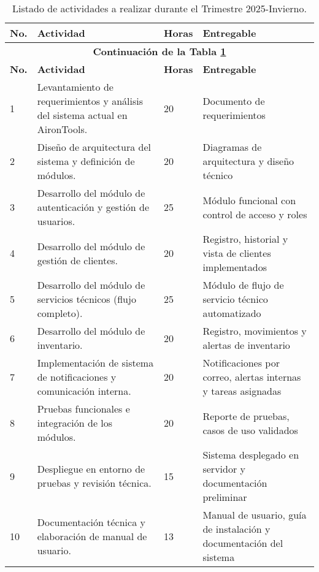 \begin{longtable}{p{} p{} p{} p{}}
	\caption{Listado de actividades a realizar durante el Trimestre 2025-Invierno.}
  	\label{table:calendarioActividades}\\
	\toprule
	\textbf{No.} & \textbf{Actividad} & \textbf{Horas} & \textbf{Entregable} \\
	\hline
	\endfirsthead

	\multicolumn{4}{c}{\textbf{Continuación de la Tabla \ref{table:calendarioActividades}}}\\
	\hline
	\textbf{No.} & \textbf{Actividad} & \textbf{Horas} & \textbf{Entregable} \\
	\hline
	\endhead

	\hline
	\endlastfoot

	1 & Levantamiento de requerimientos y análisis del sistema actual en AironTools. & 20 & Documento de requerimientos \\
	\midrule

	2 & Diseño de arquitectura del sistema y definición de módulos. & 20 & Diagramas de arquitectura y diseño técnico \\
	\midrule

	3 & Desarrollo del módulo de autenticación y gestión de usuarios. & 25 & Módulo funcional con control de acceso y roles \\
	\midrule

	4 & Desarrollo del módulo de gestión de clientes. & 20 & Registro, historial y vista de clientes implementados \\
	\midrule

	5 & Desarrollo del módulo de servicios técnicos (flujo completo). & 25 & Módulo de flujo de servicio técnico automatizado \\
	\midrule

	6 & Desarrollo del módulo de inventario. & 20 & Registro, movimientos y alertas de inventario \\
	\midrule

	7 & Implementación de sistema de notificaciones y comunicación interna. & 20 & Notificaciones por correo, alertas internas y tareas asignadas \\
	\midrule

	8 & Pruebas funcionales e integración de los módulos. & 20 & Reporte de pruebas, casos de uso validados \\
	\midrule

	9 & Despliegue en entorno de pruebas y revisión técnica. & 15 & Sistema desplegado en servidor y documentación preliminar \\
	\midrule

	10 & Documentación técnica y elaboración de manual de usuario. & 13 & Manual de usuario, guía de instalación y documentación del sistema \\
	\bottomrule
\end{longtable}

